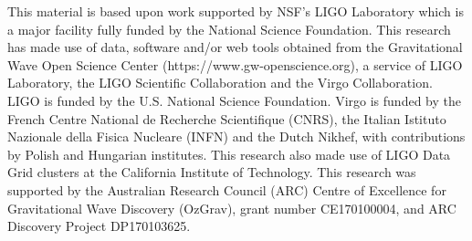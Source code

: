\documentclass[pra,superscriptaddress,reprint,amsmath,amssymb,nofootinbib]{revtex4-2}
\begin{document}



\begin{acknowledgements}
This material is based upon work supported by NSF's LIGO Laboratory which is a major facility fully funded by the National Science Foundation. This research has made use of data, software and/or web tools obtained from the Gravitational Wave Open Science Center (https://www.gw-openscience.org), a service of LIGO Laboratory, the LIGO Scientific Collaboration and the Virgo Collaboration. LIGO is funded by the U.S. National Science Foundation. Virgo is funded by the French Centre National de Recherche Scientifique (CNRS), the Italian Istituto Nazionale della Fisica Nucleare (INFN) and the Dutch Nikhef, with contributions by Polish and Hungarian institutes. This research also
made use of LIGO Data Grid clusters at the California Institute of Technology. This research was supported by
the Australian Research Council (ARC) Centre of Excellence for Gravitational Wave Discovery (OzGrav), grant number CE170100004, and ARC Discovery Project DP170103625.
\end{acknowledgements}
\end{document}
